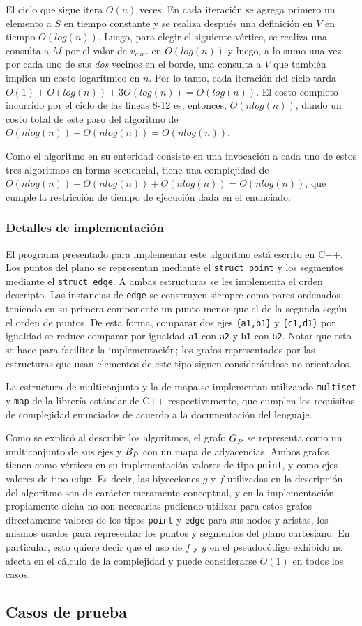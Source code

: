 El ciclo que sigue itera $O(n)$ veces. En cada iteración se agrega primero un elemento a $S$ en tiempo constante y se realiza después una definición en $V$ en tiempo $O(log(n))$. Luego, para elegir el siguiente vértice, se realiza una consulta a $M$ por el valor de $v_{\mathit{curr}}$ en $O(log(n))$ y luego, a lo sumo una vez por cada uno de sus \textit{dos} vecinos en el borde, una consulta a $V$ que también implica un costo logarítmico en $n$. Por lo tanto, cada iteración del ciclo tarda $O(1) + O(log(n)) + 3O(log(n)) = O(log(n))$. El costo completo incurrido por el ciclo de las líneas 8-12 es, entonces, $O(nlog(n))$, dando un costo total de este paso del algoritmo de $O(n log(n)) + O(n log(n)) = O(nlog(n))$.

\medskip

Como el algoritmo en su enteridad consiste en una invocación a cada uno de estos tres algoritmos en forma secuencial, tiene una complejidad de $O(n log(n)) + O(n log(n)) + O(n log(n)) = O(n log(n))$, que cumple la restricción de tiempo de ejecución dada en el enunciado.

\subsubsection{Detalles de implementación}

El programa presentado para implementar este algoritmo está escrito en C++. Los puntos del plano se representan mediante el \texttt{struct point} y los segmentos mediante el \texttt{struct edge}. A ambas estructuras se les implementa el orden descripto. Las instancias de \texttt{edge} se construyen siempre como pares ordenados, teniendo en su primera componente un punto menor que el de la segunda según el orden de puntos. De esta forma, comparar dos ejes \texttt{\{a1,b1\}} y \texttt{\{c1,d1\}} por igualdad se reduce comparar por igualdad \texttt{a1} con \texttt{a2} y \texttt{b1} con \texttt{b2}. Notar que esto se hace para facilitar la implementación; los grafos representados por las estructuras que usan elementos de este tipo siguen considerándose no-orientados.

La estructura de multiconjunto y la de mapa se implementan utilizando \texttt{multiset} y \texttt{map} de la librería estándar de C++ respectivamente, que cumplen los requisitos de complejidad enunciados de acuerdo a la documentación del lenguaje.

Como se explicó al describir los algoritmos, el grafo $G_{\bar{P}}$ se representa como un multiconjunto de sus ejes y $B_{\bar{P}}$ con un mapa de adyacencias. Ambos grafos tienen como vértices en su implementación valores de tipo \texttt{point}, y como ejes valores de tipo \texttt{edge}. Es decir, las biyecciones $g$ y $f$ utilizadas en la descripción del algoritmo son de carácter meramente conceptual, y en la implementación propiamente dicha no son necesarias pudiendo utilizar para estos grafos directamente valores de los tipos \texttt{point} y \texttt{edge} para sus nodos y aristas, los mismos usados para representar los puntos y segmentos del plano cartesiano. En particular, esto quiere decir que el uso de $f$ y $g$ en el pseudocódigo exhibido no afecta en el cálculo de la complejidad y puede considerarse $O(1)$ en todos los casos.

\subsection{Casos de prueba}

